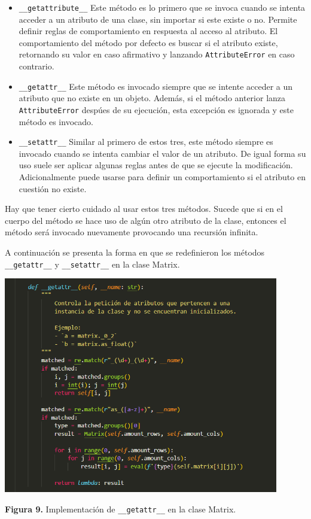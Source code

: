 \documentclass[10pt]{article} %
\newcommand{\csl}[1]{\colorbox{backcolour}{\texttt{#1}}}
\newcommand{\imgcaption}[2]{\tiny \textbf{Figura #1.} #2.}
\newcommand{\mgc}[2][]{\colorbox{backcolour}{\texttt{\_\_#2\_\_#1}}}
\newcommand{\mgccapt}[1]{\texttt{\_\_#1\_\_}}
\begin{document}
\begin{itemize}
	\item \mgc{getattribute} Este m\'etodo es lo primero que se invoca cuando se intenta acceder a un atributo de una clase, sin importar si este existe o no. Permite definir reglas de comportamiento en respuesta al acceso al atributo. El comportamiento del m\'etodo por defecto es buscar si el atributo existe, retornando su valor en caso afirmativo y lanzando \csl{AttributeError} en caso contrario.
	\item \mgc{getattr} Este m\'etodo es invocado siempre que se intente acceder a un atributo que no existe en un objeto. Adem\'as, si el m\'etodo anterior lanza \csl{AttributeError} desp\'ues de su ejecuci\'on, esta excepci\'on es ignorada y este m\'etodo es invocado. 
	\item \mgc{setattr} Similar al primero de estos tres, este m\'etodo siempre es invocado cuando se intenta cambiar el valor de un atributo. De igual forma su uso suele ser aplicar algunas reglas antes de que se ejecute la modificaci\'on. Adicionalmente puede usarse para definir un comportamiento si el atributo en cuesti\'on no existe.
\end{itemize}

Hay que tener cierto cuidado al usar estos tres m\'etodos. Sucede que si en el cuerpo del m\'etodo se hace uso de alg\'un otro atributo de la clase, entonces el m\'etodo ser\'a invocado nuevamente provocando una recursi\'on infinita.

A continuaci\'on se presenta la forma en que se redefinieron los m\'etodos \mgc{getattr} y \mgc{setattr} en la clase Matrix.

\begin{center}
	\includegraphics[width=12cm]{getattr.png} 
	
	\imgcaption{9}{Implementaci\'on de \mgccapt{getattr} en la clase Matrix}
\end{center}
\end{document}
